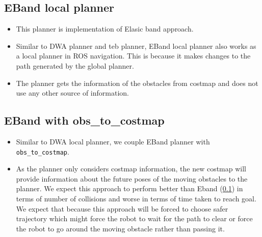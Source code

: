 \subsection{EBand local planner}%
\label{sub:eband_local_planner}
\begin{itemize}
    \item This planner\cite{eband} is implementation of Elasic band approach\cite{quinlan1993elastic}.
    \item Similar to DWA planner and teb planner, EBand local planner also works as a local planner
        in ROS navigation\cite{rosnavigation}. This is because it makes changes to the path generated
        by the global planner. 
    \item The planner gets the information of the obstacles from costmap and does not use any other 
        source of information.
\end{itemize}

\subsection{EBand with obs\_to\_costmap}%
\label{sub:eband_with_obs_to_costmap}
\begin{itemize}
    \item Similar to DWA local planner, we couple EBand planner\cite{eband} with \texttt{obs\_to\_costmap}.
    \item As the planner only considers costmap information, the new costmap will provide information
        about the future poses of the moving obstacles to the planner. We expect this approach to 
        perform better than Eband (\ref{sub:eband_local_planner}) in terms of number of collisions and worse in
        terms of time taken to reach goal. We expect that because this approach will be forced to 
        choose safer trajectory which might force the robot to wait for the path to clear or force 
        the robot to go around the moving obstacle rather than passing it.
\end{itemize}







